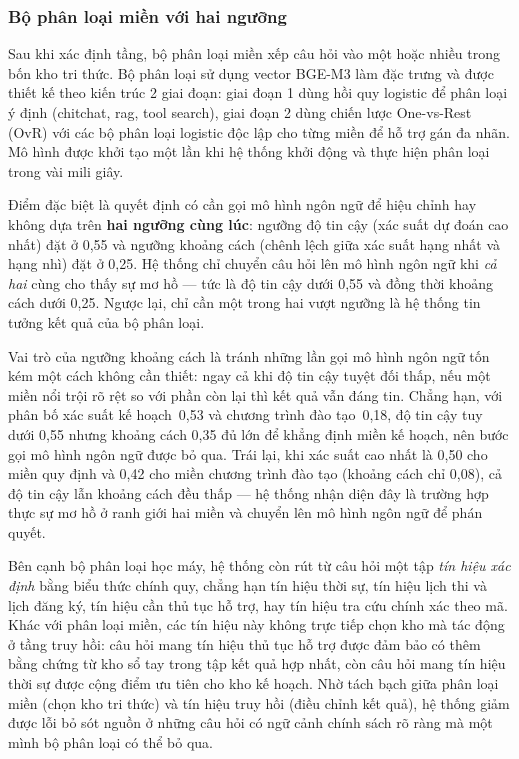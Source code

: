 \documentclass[../DoAn.tex]{subfiles}
\begin{document}
\subsubsection{Bộ phân loại miền với hai ngưỡng}

Sau khi xác định tầng, bộ phân loại miền xếp câu hỏi vào một hoặc nhiều trong
bốn kho tri thức. Bộ phân loại sử dụng vector BGE-M3 làm đặc trưng và được thiết kế theo kiến trúc 2 giai đoạn: giai đoạn 1 dùng hồi quy logistic để phân loại ý định (chitchat, rag, tool search), giai đoạn 2 dùng chiến lược One-vs-Rest (OvR) với các bộ phân loại logistic độc lập cho từng miền để hỗ trợ gán đa nhãn. Mô hình được khởi tạo một lần khi hệ thống khởi động và thực hiện phân
loại trong vài mili giây.

Điểm đặc biệt là quyết định có cần gọi mô hình ngôn ngữ để hiệu chỉnh hay không
dựa trên \textbf{hai ngưỡng cùng lúc}: ngưỡng độ tin cậy (xác suất dự đoán cao
nhất) đặt ở 0,55 và ngưỡng khoảng cách (chênh lệch giữa xác suất hạng nhất và
hạng nhì) đặt ở 0,25. Hệ thống chỉ chuyển câu hỏi lên mô hình ngôn ngữ khi
\textit{cả hai} cùng cho thấy sự mơ hồ --- tức là độ tin cậy dưới 0,55 và đồng
thời khoảng cách dưới 0,25. Ngược lại, chỉ cần một trong hai vượt ngưỡng là hệ
thống tin tưởng kết quả của bộ phân loại.

Vai trò của ngưỡng khoảng cách là tránh những lần gọi mô hình ngôn ngữ tốn kém
một cách không cần thiết: ngay cả khi độ tin cậy tuyệt đối thấp, nếu một miền
nổi trội rõ rệt so với phần còn lại thì kết quả vẫn đáng tin. Chẳng hạn, với
phân bố xác suất kế hoạch~0,53 và chương trình đào tạo~0,18, độ tin cậy tuy
dưới 0,55 nhưng khoảng cách 0,35 đủ lớn để khẳng định miền kế hoạch, nên bước
gọi mô hình ngôn ngữ được bỏ qua. Trái lại, khi xác suất cao nhất là 0,50 cho
miền quy định và 0,42 cho miền chương trình đào tạo (khoảng cách chỉ 0,08), cả
độ tin cậy lẫn khoảng cách đều thấp --- hệ thống nhận diện đây là trường hợp
thực sự mơ hồ ở ranh giới hai miền và chuyển lên mô hình ngôn ngữ để phán quyết.

Bên cạnh bộ phân loại học máy, hệ thống còn rút từ câu hỏi một tập \textit{tín
hiệu xác định} bằng biểu thức chính quy, chẳng hạn tín hiệu thời sự, tín hiệu
lịch thi và lịch đăng ký, tín hiệu cần thủ tục hỗ trợ, hay tín hiệu tra cứu
chính xác theo mã. Khác với phân loại miền, các tín hiệu này không trực tiếp
chọn kho mà tác động ở tầng truy hồi: câu hỏi mang tín hiệu thủ tục hỗ trợ được
đảm bảo có thêm bằng chứng từ kho sổ tay trong tập kết quả hợp nhất, còn câu
hỏi mang tín hiệu thời sự được cộng điểm ưu tiên cho kho kế hoạch. Nhờ tách bạch
giữa phân loại miền (chọn kho tri thức) và tín hiệu truy hồi (điều chỉnh kết
quả), hệ thống giảm được lỗi bỏ sót nguồn ở những câu hỏi có ngữ cảnh chính
sách rõ ràng mà một mình bộ phân loại có thể bỏ qua.
\end{document}
